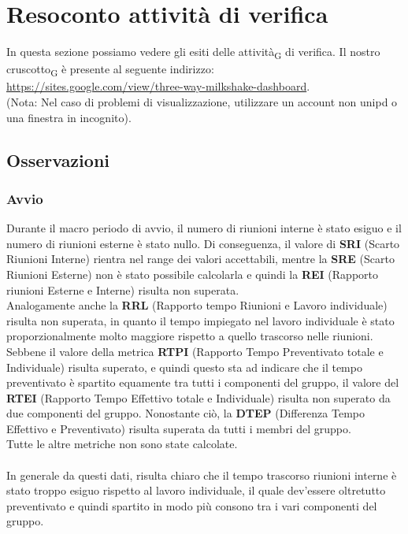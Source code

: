 
\section{Resoconto {attività} di verifica}
In questa sezione possiamo vedere gli esiti delle attività\textsubscript{G} di verifica.
Il nostro cruscotto\textsubscript{G} è presente al seguente indirizzo:\\ \url{https://sites.google.com/view/three-way-milkshake-dashboard}.\\ (Nota: Nel caso di problemi di visualizzazione, utilizzare un account non unipd o una finestra in incognito).
\subsection{Osservazioni}
\subsubsection{Avvio}
Durante il macro periodo di avvio, il numero di riunioni interne è stato esiguo e il numero di riunioni esterne è stato nullo. Di conseguenza, il valore di \textbf{SRI} (Scarto Riunioni Interne) rientra nel range dei valori accettabili, mentre la \textbf{SRE} (Scarto Riunioni Esterne) non è stato possibile calcolarla e quindi la \textbf{REI} (Rapporto riunioni Esterne e Interne) risulta non superata. \\
Analogamente anche la \textbf{RRL} (Rapporto tempo Riunioni e Lavoro individuale) risulta non superata, in quanto il tempo impiegato nel lavoro individuale è stato proporzionalmente molto maggiore rispetto a quello trascorso nelle riunioni. \\
Sebbene il valore della metrica \textbf{RTPI} (Rapporto Tempo Preventivato totale e Individuale) risulta superato, e quindi questo sta ad indicare che il tempo preventivato è spartito equamente tra tutti i componenti del gruppo, il valore del \textbf{RTEI} (Rapporto Tempo Effettivo totale e Individuale) risulta non superato da due componenti del gruppo. Nonostante ciò, la \textbf{DTEP} (Differenza Tempo Effettivo e Preventivato) risulta superata da tutti i membri del gruppo.\\
Tutte le altre metriche non sono state calcolate.\\\\
In generale da questi dati, risulta chiaro che il tempo trascorso riunioni interne è stato troppo esiguo rispetto al lavoro individuale, il quale dev'essere oltretutto preventivato e quindi spartito in modo più consono tra i vari componenti del gruppo.

